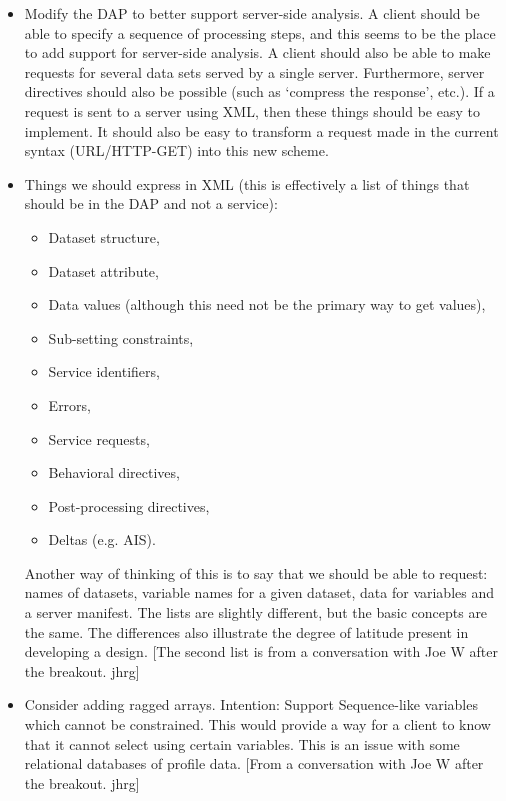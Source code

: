 \begin{itemize}
\item Modify the DAP to better support server-side analysis. A client should be
  able to specify a sequence of processing steps, and this seems to be the
  place to add support for server-side analysis. A client should also be able
  to make requests for several data sets served by a single server.
  Furthermore, server directives should also be possible (such as `compress
  the response', etc.). If a request is sent to a server using XML, then
  these things should be easy to implement. It should also be easy to
  transform a request made in the current syntax (URL/HTTP-GET) into this new
  scheme.

\item Things we should express in XML (this is effectively a list of things that
  should be in the DAP and not a service): 

  \begin{itemize}
  \item Dataset structure, 
  \item Dataset attribute, 
  \item Data values (although this need not be the primary way to get
    values), 
  \item Sub-setting constraints, 
  \item Service identifiers, 
  \item Errors, 
  \item Service requests, 
  \item Behavioral directives, 
  \item Post-processing directives, 
  \item Deltas (e.g.  AIS).
  \end{itemize}
  
  Another way of thinking of this is to say that we should be able to
  request: names of datasets, variable names for a given dataset, data for
  variables and a server manifest. The lists are slightly different, but the
  basic concepts are the same. The differences also illustrate the degree of
  latitude present in developing a design. [The second list is from a
  conversation with Joe W after the breakout. jhrg]

\item Consider adding ragged arrays. Intention: Support Sequence-like variables
  which cannot be constrained. This would provide a way for a client to know
  that it cannot select using certain variables. This is an issue with some
  relational databases of profile data. [From a conversation with Joe W after
  the breakout. jhrg]


\end{itemize}

